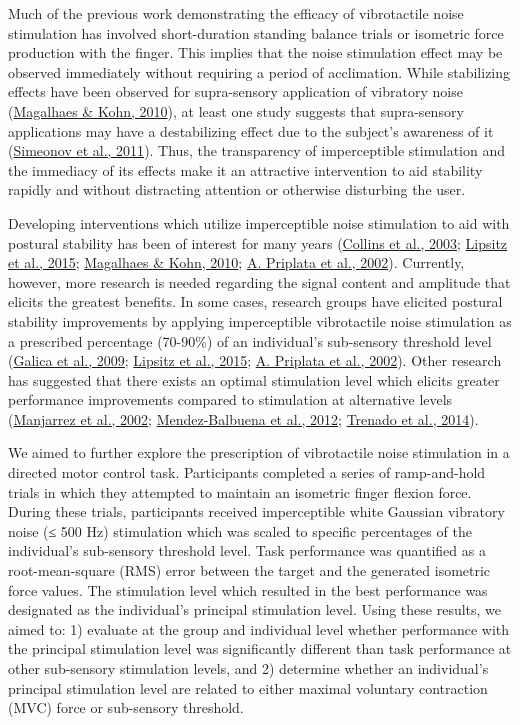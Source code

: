 \documentclass[]{cik}%
\begin{document}
Much of the previous work demonstrating the efficacy of vibrotactile
noise stimulation has involved short-duration standing balance trials or
isometric force production with the finger. This implies that the noise
stimulation effect may be observed immediately without requiring a
period of acclimation. While stabilizing effects have been observed for
supra-sensory application of vibratory noise
(\protect\hyperlink{ref-magalhuxe3es2011}{Magalhaes \& Kohn, 2010}), at
least one study suggests that supra-sensory applications may have a
destabilizing effect due to the subject's awareness of it
(\protect\hyperlink{ref-Simeonov2011}{Simeonov et al., 2011}). Thus, the
transparency of imperceptible stimulation and the immediacy of its
effects make it an attractive intervention to aid stability rapidly and
without distracting attention or otherwise disturbing the user.

Developing interventions which utilize imperceptible noise stimulation
to aid with postural stability has been of interest for many years
(\protect\hyperlink{ref-Collins2003}{Collins et al., 2003};
\protect\hyperlink{ref-Lipsitz2015}{Lipsitz et al., 2015};
\protect\hyperlink{ref-magalhuxe3es2011}{Magalhaes \& Kohn, 2010};
\protect\hyperlink{ref-Priplata2002}{A. Priplata et al., 2002}).
Currently, however, more research is needed regarding the signal content
and amplitude that elicits the greatest benefits. In some cases,
research groups have elicited postural stability improvements by
applying imperceptible vibrotactile noise stimulation as a prescribed
percentage (70-90\%) of an individual's sub-sensory threshold level
(\protect\hyperlink{ref-Galica2009}{Galica et al., 2009};
\protect\hyperlink{ref-Lipsitz2015}{Lipsitz et al., 2015};
\protect\hyperlink{ref-Priplata2002}{A. Priplata et al., 2002}). Other
research has suggested that there exists an optimal stimulation level
which elicits greater performance improvements compared to stimulation
at alternative levels (\protect\hyperlink{ref-Manjarrez2002}{Manjarrez
et al., 2002};
\protect\hyperlink{ref-Mendez-Balbuena2012}{Mendez-Balbuena et al.,
2012}; \protect\hyperlink{ref-Trenado2014}{Trenado et al., 2014}).

We aimed to further explore the prescription of vibrotactile noise
stimulation in a directed motor control task. Participants completed a
series of ramp-and-hold trials in which they attempted to maintain an
isometric finger flexion force. During these trials, participants
received imperceptible white Gaussian vibratory noise (≤ 500 Hz)
stimulation which was scaled to specific percentages of the individual's
sub-sensory threshold level. Task performance was quantified as a
root-mean-square (RMS) error between the target and the generated
isometric force values. The stimulation level which resulted in the best
performance was designated as the individual's principal stimulation
level. Using these results, we aimed to: 1) evaluate at the group and
individual level whether performance with the principal stimulation
level was significantly different than task performance at other
sub-sensory stimulation levels, and 2) determine whether an individual's
principal stimulation level are related to either maximal voluntary
contraction (MVC) force or sub-sensory threshold.
\end{document}
